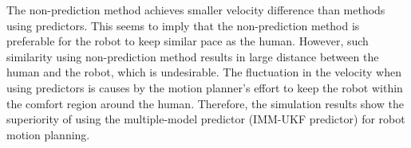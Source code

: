 \documentclass[letterpaper, 10 pt, conference]{ieeeconf}
\begin{document}
	
	The non-prediction method achieves smaller velocity difference than methods using predictors.
	This seems to imply that the non-prediction method is preferable for the robot to keep similar pace as the human.
	However, such similarity using non-prediction method results in large distance between the human and the robot, which is undesirable.
	The fluctuation in the velocity when using predictors is causes by the motion planner's effort to keep the robot within the comfort region around the human.
	Therefore, the simulation results show the superiority of using the multiple-model predictor (IMM-UKF predictor) for robot motion planning.
	
\end{document}
